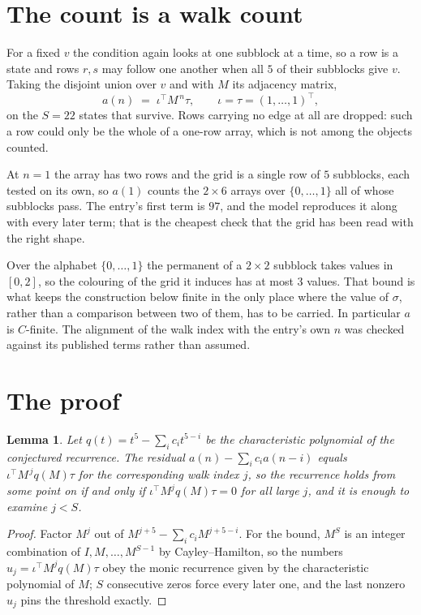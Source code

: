 \documentclass[11pt,a4paper]{article}
\theoremstyle{plain}
\newtheorem{lemma}[theorem]{Lemma}
\theoremstyle{definition}
\begin{document}
\section{The count is a walk count}

For a fixed $v$ the condition again looks at one subblock at a time, so a
row is a state and rows $r,s$ may follow one another when all $5$ of their subblocks give
$v$. Taking the disjoint union over $v$ and with $M$ its adjacency matrix,
\[
a(n)\;=\;\iota^{\!\top}M^{\,n}\tau,\qquad\iota=\tau=(1,\dots,1)^{\!\top},
\]
on the $S=22$ states that survive. Rows carrying no edge at all are dropped: such a row could
only be the whole of a one-row array, which is not among the objects counted.

At $n=1$ the array has two rows and the grid is a single row of $5$
subblocks, each tested on its own, so $a(1)$ counts the
$2\times6$ arrays over $\{0,\dots,1\}$ all of whose subblocks pass. The entry's
first term is $97$, and the model reproduces it along with every later term; that is the
cheapest check that the grid has been read with the right shape.

Over the alphabet $\{0,\dots,1\}$ the permanent of a $2\times2$ subblock takes values in
$[0,2]$, so the colouring of the grid it induces has at most $3$ values.
That bound is what keeps the construction below finite in the only place where the value of
$\sigma$, rather than a comparison between two of them, has to be carried.
In particular $a$ is $C$-finite. The alignment of the walk index with the entry's own $n$ was
checked against its published terms rather than assumed.

\section{The proof}

\begin{lemma}\label{lem:crit}
Let $q(t)=t^{5}-\sum_i c_it^{5-i}$ be the characteristic polynomial of the
conjectured recurrence. The residual $a(n)-\sum_ic_ia(n-i)$ equals
$\iota^{\!\top}M^{\,j}q(M)\tau$ for the corresponding walk index $j$, so the recurrence
holds from some point on if and only if $\iota^{\!\top}M^{j}q(M)\tau=0$ for all large $j$,
and it is enough to examine $j<S$.
\end{lemma}

\begin{proof}
Factor $M^{j}$ out of $M^{j+5}-\sum_ic_iM^{j+5-i}$. For the bound, $M^{S}$
is an integer combination of $I,M,\dots,M^{S-1}$ by Cayley--Hamilton, so the numbers
$u_j=\iota^{\!\top}M^{j}q(M)\tau$ obey the monic recurrence given by the characteristic
polynomial of $M$; $S$ consecutive zeros force every later one, and the last nonzero $u_j$
pins the threshold exactly.
\end{proof}
\end{document}
